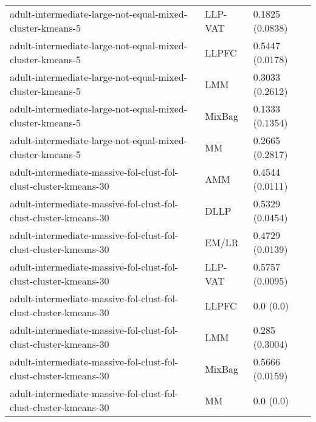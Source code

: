 \begin{longtable}{lll}
                                                    adult-intermediate-large-not-equal-mixed-cluster-kmeans-5 &   LLP-VAT &                       0.1825 (0.0838) \\
                                                    adult-intermediate-large-not-equal-mixed-cluster-kmeans-5 &     LLPFC &                       0.5447 (0.0178) \\
                                                    adult-intermediate-large-not-equal-mixed-cluster-kmeans-5 &       LMM &                       0.3033 (0.2612) \\
                                                    adult-intermediate-large-not-equal-mixed-cluster-kmeans-5 &    MixBag &                       0.1333 (0.1354) \\
                                                    adult-intermediate-large-not-equal-mixed-cluster-kmeans-5 &        MM &                       0.2665 (0.2817) \\
                                             adult-intermediate-massive-fol-clust-fol-clust-cluster-kmeans-30 &       AMM &                       0.4544 (0.0111) \\
                                             adult-intermediate-massive-fol-clust-fol-clust-cluster-kmeans-30 &      DLLP &                       0.5329 (0.0454) \\
                                             adult-intermediate-massive-fol-clust-fol-clust-cluster-kmeans-30 &     EM/LR &                       0.4729 (0.0139) \\
                                             adult-intermediate-massive-fol-clust-fol-clust-cluster-kmeans-30 &   LLP-VAT &                       0.5757 (0.0095) \\
                                             adult-intermediate-massive-fol-clust-fol-clust-cluster-kmeans-30 &     LLPFC &                             0.0 (0.0) \\
                                             adult-intermediate-massive-fol-clust-fol-clust-cluster-kmeans-30 &       LMM &                        0.285 (0.3004) \\
                                             adult-intermediate-massive-fol-clust-fol-clust-cluster-kmeans-30 &    MixBag &                       0.5666 (0.0159) \\
                                             adult-intermediate-massive-fol-clust-fol-clust-cluster-kmeans-30 &        MM &                             0.0 (0.0) \\

\end{longtable}
